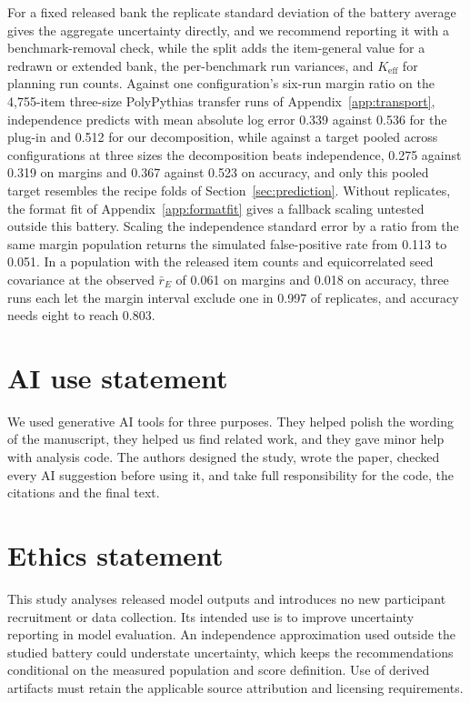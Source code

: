 For a fixed released bank the replicate standard deviation of the battery average gives the aggregate uncertainty directly, and we recommend reporting it with a benchmark-removal check, while the split adds the item-general value for a redrawn or extended bank, the per-benchmark run variances, and $K_{\mathrm{eff}}$ for planning run counts. Against one configuration's six-run margin ratio on the 4,755-item three-size PolyPythias transfer runs of Appendix~\ref{app:transport}, independence predicts with mean absolute log error 0.339 against 0.536 for the plug-in and 0.512 for our decomposition, while against a target pooled across configurations at three sizes the decomposition beats independence, 0.275 against 0.319 on margins and 0.367 against 0.523 on accuracy, and only this pooled target resembles the recipe folds of Section~\ref{sec:prediction}. Without replicates, the format fit of Appendix~\ref{app:formatfit} gives a fallback scaling untested outside this battery. Scaling the independence standard error by a ratio from the same margin population returns the simulated false-positive rate from 0.113 to 0.051. In a population with the released item counts and equicorrelated seed covariance at the observed $\bar r_E$ of 0.061 on margins and 0.018 on accuracy, three runs each let the margin interval exclude one in 0.997 of replicates, and accuracy needs eight to reach 0.803.

\label{maintext:end}
\section*{AI use statement}
We used generative AI tools for three purposes. They helped polish the wording of the manuscript, they helped us find related work, and they gave minor help with analysis code. The authors designed the study, wrote the paper, checked every AI suggestion before using it, and take full responsibility for the code, the citations and the final text.

\section*{Ethics statement}
This study analyses released model outputs and introduces no new participant recruitment or data collection. Its intended use is to improve uncertainty reporting in model evaluation. An independence approximation used outside the studied battery could understate uncertainty, which keeps the recommendations conditional on the measured population and score definition. Use of derived artifacts must retain the applicable source attribution and licensing requirements.

